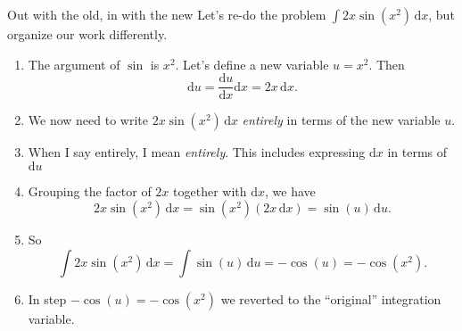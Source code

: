 \documentclass[fleqn]{beamer}
\theoremstyle{definition}
\newenvironment{checklist}{
  \begin{enumerate}[\ding{51}]
    \addtolength{\itemsep}{-0.0\itemsep}}
  {\end{enumerate}}
\begin{document}
\begin{frame}{Out with the old, in with the new}
Let's re-do the problem  \(\int 2 x  \sin(x^2) \, \mathrm{d} x \), but organize our work differently.

\begin{checklist}
\item  The argument of \(\sin\) is \(x^2\).  Let's define a new variable \(u = x^2\).   Then
\[
    \mathrm{d} u = \frac{\mathrm{d} u}{\mathrm{d} x} \mathrm{d} x = 2 x  \, \mathrm{d} x.
\]

\item  We now need to write \(  2 x  \sin(x^2) \, \mathrm{d} x  \)  \emph{entirely} in terms of the new variable \(u\).  

\item When I say entirely, I mean \emph{entirely}. This includes expressing \(\mathrm{d} x \) in terms of  \(\mathrm{d} u \) 

\item Grouping the factor of \(2 x\) together with \(\mathrm{d} x\), we have 
\[
   2 x  \sin(x^2) \, \mathrm{d} x   = \sin(x^2)     (2 x \,  \mathrm{d} x  ) = \sin(u) \, \mathrm{d} u.
\]
\item So
\[
   \int 2 x  \sin(x^2) \, \mathrm{d} x   = \int  \sin(u) \, \mathrm{d} u = -\cos(u) = -\cos(x^2).
\]
\item In step   \(-\cos(u) = -\cos(x^2) \) we reverted to the ``original'' integration variable.

\end{checklist}

\end{frame}
\end{document}
